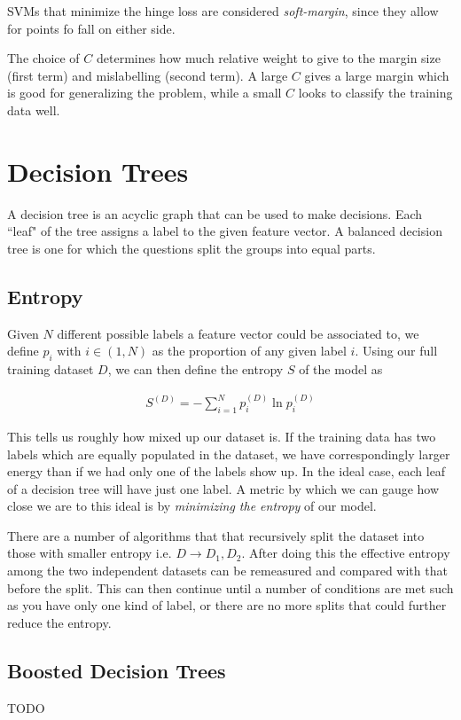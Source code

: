 SVMs that minimize the hinge loss are considered \emph{soft-margin}, since they allow for points fo fall on either side.

The choice of $C$ determines how much relative weight to give to the margin size (first term) and mislabelling (second term). A large $C$ gives a large margin which is good for generalizing the problem, while a small $C$  looks to classify the training data well.

\section{Decision Trees}
A decision tree is an acyclic graph that can be used to make decisions. Each ``leaf" of the tree assigns a label to the given feature vector. A balanced decision tree is one for which the questions split the groups into equal parts.

\subsection{Entropy}
Given $N$ different possible labels a feature vector could be associated to, we define $p_i$ with $i\in (1,N)$ as the proportion of any given label $i$. Using our full training dataset $D$, we can then define the entropy $S$ of the model as 

\begin{align}
	S^{(D)} = -\sum_{i=1}^N p^{(D)}_i\ln p^{(D)}_i
\end{align}

This tells us roughly how mixed up our dataset is. If the training data has two labels which are equally populated in the dataset, we have correspondingly larger energy than if we had only one of the labels show up. In the ideal case, each leaf of a decision tree will have just one label. A metric by which we can gauge how close we are to this ideal is by \emph{minimizing the entropy} of our model. 

There are a number of algorithms that that recursively split the dataset into those with smaller entropy i.e. $D\rightarrow D_1, D_2$. After doing this the effective entropy among the two independent datasets can be remeasured and compared with that before the split. This can then continue until a number of conditions are met such as you have only one kind of label, or there are no more splits that could further reduce the entropy.

\subsection{Boosted Decision Trees}
TODO
